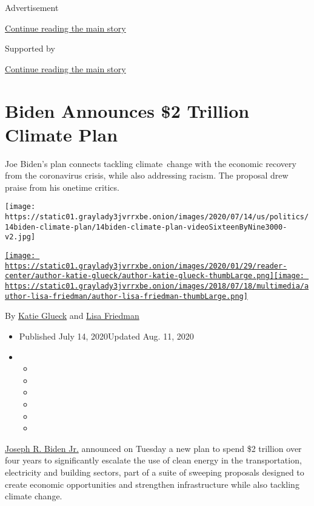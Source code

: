 Advertisement

\protect\hyperlink{after-top}{Continue reading the main story}

Supported by

\protect\hyperlink{after-sponsor}{Continue reading the main story}

\hypertarget{biden-announces-2-trillion-climate-plan}{%
\section{Biden Announces \$2 Trillion Climate
Plan}\label{biden-announces-2-trillion-climate-plan}}

Joe Biden's plan connects tackling climate~change with the economic
recovery from the coronavirus crisis, while also addressing racism. The
proposal drew praise from his onetime critics.

\texttt{[image: https://static01.graylady3jvrrxbe.onion/images/2020/07/14/us/politics/14biden-climate-plan/14biden-climate-plan-videoSixteenByNine3000-v2.jpg]}

\href{https://www.nytimes3xbfgragh.onion/by/katie-glueck}{\texttt{[image: https://static01.graylady3jvrrxbe.onion/images/2020/01/29/reader-center/author-katie-glueck/author-katie-glueck-thumbLarge.png]}}\href{https://www.nytimes3xbfgragh.onion/by/lisa-friedman}{\texttt{[image: https://static01.graylady3jvrrxbe.onion/images/2018/07/18/multimedia/author-lisa-friedman/author-lisa-friedman-thumbLarge.png]}}

By \href{https://www.nytimes3xbfgragh.onion/by/katie-glueck}{Katie
Glueck} and
\href{https://www.nytimes3xbfgragh.onion/by/lisa-friedman}{Lisa
Friedman}

\begin{itemize}
\item
  Published July 14, 2020Updated Aug. 11, 2020
\item
  \begin{itemize}
  \item
  \item
  \item
  \item
  \item
  \item
  \end{itemize}
\end{itemize}

\href{https://www.nytimes3xbfgragh.onion/interactive/2020/us/elections/joe-biden.html}{Joseph
R. Biden Jr.} announced on Tuesday a new plan to spend \$2 trillion over
four years to significantly escalate the use of clean energy in the
transportation, electricity and building sectors, part of a suite of
sweeping proposals designed to create economic opportunities and
strengthen infrastructure while also tackling climate change.

